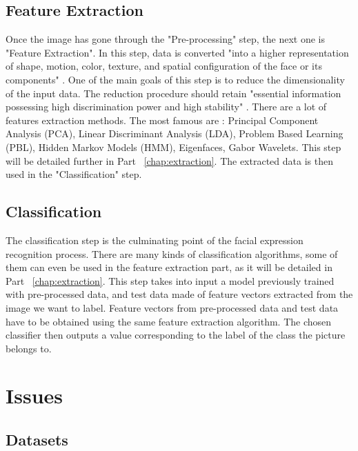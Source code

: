\subsection{Feature Extraction}

\vspace{\baselineskip}
\noindent Once the image has gone through the "Pre-processing" step, the next one is "Feature Extraction". In this step, data is converted "into a higher representation of shape, motion, color, texture, and spatial configuration of the face or its components" \cite{CHI03}. One of the main goals of this step is to reduce the dimensionality of the input data. The reduction procedure should retain "essential information possessing high discrimination power and high stability" \cite{CHI03}. There are a lot of features extraction methods. The most famous are : Principal Component Analysis (PCA), Linear Discriminant Analysis (LDA), Problem Based Learning (PBL), Hidden Markov Models (HMM), Eigenfaces, Gabor Wavelets. This step will be detailed further in Part ~\ref{chap:extraction}. The extracted data is then used in the "Classification" step.
\newline

\subsection{Classification}

\noindent The classification step is the culminating point of the facial expression recognition process. There are many kinds of classification algorithms, some of them can even be used in the feature extraction part, as it will be detailed in Part ~\ref{chap:extraction}. This step takes into input a model previously trained with pre-processed data, and test data made of feature vectors extracted from the image we want to label. Feature vectors from pre-processed data and test data have to be obtained using the same feature extraction algorithm. The chosen classifier then outputs a value corresponding to the label of the class the picture belongs to.

\section{Issues}

\vspace{\baselineskip}
\subsection{Datasets}

